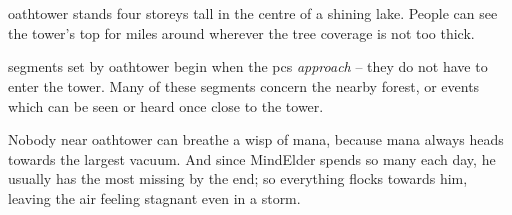 \section{}

\begin{figure}[t!]
  \label{oathtower}
\end{figure}

\Gls{oathtower} stands four storeys tall in the centre of a shining lake.
People can see the tower's top for miles around wherever the tree coverage is not too thick.

\Glspl{segment} set by \gls{oathtower} begin when the \glspl{pc} \emph{approach} -- they do not have to enter the tower.
Many of these \glspl{segment} concern the nearby forest, or events which can be seen or heard once close to the tower.

Nobody near \gls{oathtower} can breathe a wisp of mana, because mana always heads towards the largest vacuum.
And since \gls{MindElder} spends so many  each day, he usually has the most missing by the end; so everything flocks towards him, leaving the air feeling stagnant even in a storm.


